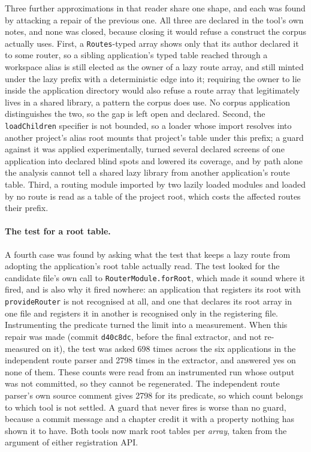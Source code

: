 Three further approximations in that reader share one shape, and each was found by attacking a repair of the previous one. All three are declared in the tool's own notes, and none was closed, because closing it would refuse a construct the corpus actually uses. First, a \texttt{Routes}-typed array shows only that its author declared it to some router, so a sibling application's typed table reached through a workspace alias is still elected as the owner of a lazy route array, and still minted under the lazy prefix with a deterministic edge into it; requiring the owner to lie inside the application directory would also refuse a route array that legitimately lives in a shared library, a pattern the corpus does use. No corpus application distinguishes the two, so the gap is left open and declared. Second, the \texttt{loadChildren} specifier is not bounded, so a loader whose import resolves into another project's alias root mounts that project's table under this prefix; a guard against it was applied experimentally, turned several declared screens of one application into declared blind spots and lowered its coverage, and by path alone the analysis cannot tell a shared lazy library from another application's route table. Third, a routing module imported by two lazily loaded modules and loaded by no route is read as a table of the project root, which costs the affected routes their prefix.

\paragraph{The test for a root table.} A fourth case was found by asking what the test that keeps a lazy route from adopting the application's root table actually read. The test looked for the candidate file's own call to \texttt{RouterModule.forRoot}, which made it sound where it fired, and is also why it fired nowhere: an application that registers its root with \texttt{provideRouter} is not recognised at all, and one that declares its root array in one file and registers it in another is recognised only in the registering file. Instrumenting the predicate turned the limit into a measurement. When this repair was made (commit \texttt{d40c8dc}, before the final extractor, and not re-measured on it), the test was asked 698 times across the six applications in the independent route parser and 2798 times in the extractor, and answered yes on none of them. These counts were read from an instrumented run whose output was not committed, so they cannot be regenerated. The independent route parser's own source comment gives 2798 for its predicate, so which count belongs to which tool is not settled. A guard that never fires is worse than no guard, because a commit message and a chapter credit it with a property nothing has shown it to have. Both tools now mark root tables per \emph{array}, taken from the argument of either registration API.

